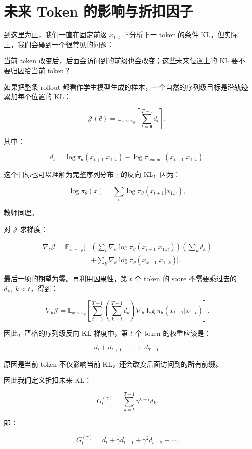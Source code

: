 \documentclass[11pt,a4paper,fontset=fandol]{ctexart}
\begin{document}
\section{未来 Token 的影响与折扣因子}

到这里为止，我们一直在固定前缀 \(x_{1..t}\) 下分析下一 token 的条件 KL。但实际上，我们会碰到一个很常见的问题：

当前 token 改变后，后面会访问到的前缀也会改变；这些未来位置上的 KL 要不要归因给当前 token？

如果把整条 rollout 都看作学生模型生成的样本，一个自然的序列级目标是沿轨迹累加每个位置的 KL：

\[
\mathcal J(\theta)
=
\mathbb E_{x\sim\pi_\theta}
\left[
\sum_{t=0}^{T-1}d_t
\right],
\]

其中：

\[
d_t
=
\log\pi_\theta(x_{t+1}|x_{1..t})
-
\log\pi_{\text{teacher}}(x_{t+1}|x_{1..t}).
\]

这个目标也可以理解为完整序列分布上的反向 KL，因为：

\[
\log\pi_\theta(x)
=
\sum_t
\log\pi_\theta(x_{t+1}|x_{1..t}),
\]

教师同理。

对 \(\mathcal J\) 求梯度：

\[
\begin{aligned}
\nabla_\theta\mathcal J
=
\mathbb E_{x\sim\pi_\theta}
\Bigg[
&
\left(
\sum_t\nabla_\theta
\log\pi_\theta(x_{t+1}|x_{1..t})
\right)
\left(
\sum_k d_k
\right)\\
&+
\sum_k
\nabla_\theta
\log\pi_\theta(x_{k+1}|x_{1..k})
\Bigg].
\end{aligned}
\]

最后一项的期望为零。再利用因果性，第 \(t\) 个 token 的 score 不需要乘过去的 \(d_k,\;k<t\)，得到：

\[
\boxed{
\nabla_\theta\mathcal J
=
\mathbb E_{x\sim\pi_\theta}
\left[
\sum_{t=0}^{T-1}
\left(
\sum_{k=t}^{T-1}d_k
\right)
\nabla_\theta
\log\pi_\theta(x_{t+1}|x_{1..t})
\right].
}
\]

因此，严格的序列级反向 KL 梯度中，第 \(t\) 个 token 的权重应该是：

\[
d_t+d_{t+1}+\cdots+d_{T-1}.
\]

原因是当前 token 不仅影响当前 KL，还会改变后面访问到的所有前缀。

因此我们定义折扣未来 KL：

\[
G_t^{(\gamma)}
=
\sum_{k=t}^{T-1}
\gamma^{k-t}d_k.
\]

即：

\[
G_t^{(\gamma)}
=
d_t+\gamma d_{t+1}+\gamma^2d_{t+2}+\cdots.
\]
\end{document}
